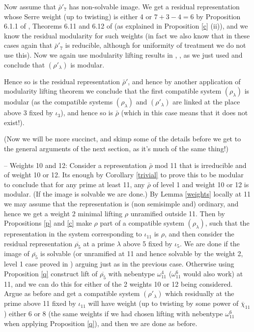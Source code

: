 \documentclass[12pt]{amsart}
\newcommand{\rhobar}{\overline{\rho}}
\def\rhobar{ {\bar {\rho} } }
\def\rhob{ {\bar {\rho} } }
\begin{document}
Now assume that $\rhob'_7$ has non-solvable image. We get a
residual representation whose Serre weight (up to twisting) is either 4
or $7+3-4=6$  by Proposition 6.1.1 of \cite{BM}, Theorems 6.11 and 6.12 of 
 \cite{Savitt1} (as explained in Proposition \ref{c} (ii)), 
and we know the residual modularity for such weights (in fact we also know that in these cases again that $\rhob'_7$ is reducible,
although for uniformity of treatment we do not use this).  
Now we again use modularity lifting results in \cite{SW2}, \cite{SW3}, \cite{Kisin} as we just used and conclude that 
$(\rho'_{\lambda})$ is modular.

Hence so is the residual representation 
$\rhobar'$, and hence by another application of modularity lifting theorem 
we conclude that the first compatible system $(\rho_{\lambda})$ is modular (as the compatible systems $(\rho_{\lambda})$ and $(\rho'_{\lambda})$ are linked at the place above 3 fixed by $\iota_3$), and hence so is $\rhobar$ (which in this case means that it does not exist!).

(Now we will be more succinct, and skimp some of the details before we get to the general arguments of the next section, as it's much of the same thing!)

-- Weights 10 and 12: Consider a representation $\rhob$ mod 11 that is irreducible and of
weight 10 or 12. Its enough by Corollary \ref{trivial} to prove this to be modular to conclude that for any prime at least 11, any $\rhob$ of level 1 and 
weight 10 or 12 is modular. (If the image is solvable we are done.) By Lemma \ref{weights} locally at 11 we may assume that the representation is (non semisimple and)
ordinary, and hence we get a weight 2 minimal lifting $\rho$ unramified outside 11. 
Then by Propositions \ref{p} and  \ref{c} make $\rho$ part of a 
compatible system $(\rho_{\lambda})$, 
such that the representation in the system corresponding to $\iota_{11}$ is $\rho$,
and then consider the residual representation $\overline{\rho_{5}}$ 
at a prime $\lambda$ above 5 fixed by $\iota_5$.  We are done if the image
of $\overline{\rho_{5}}$ is solvable (or unramified at 11 and hence solvable by the weight 2, level 1 case proved in \cite{KW}) arguing just as in the previous case. 
Otherwise using Proposition \ref{q} construct lift of $\overline{\rho_{5}}$ with nebentype $\omega_{11}^4$ ($\omega_{11}^6$ would also work) at 11, and we can do this for either of the 2 weights 10 or 12 being considered.
Argue as before and get a compatible system $(\rho'_{\lambda})$ which residually 
at the  prime above 11 fixed by $\iota_{11}$ 
will have weight (up to twisting by some power of $\overline \chi_{11}$)
either 6 or 8 (the same weights if we had chosen lifting with nebentype $\omega_{11}^6$  when applying Proposition \ref{q}), and then we are done as before.
\end{document}
